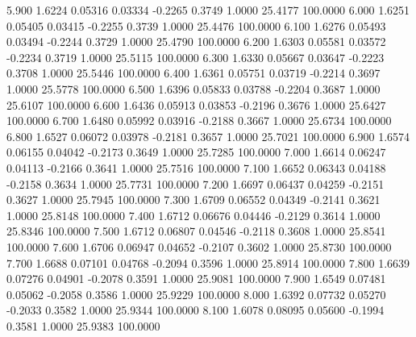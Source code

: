    5.900   1.6224   0.05316   0.03334  -0.2265   0.3749   1.0000  25.4177 100.0000
   6.000   1.6251   0.05405   0.03415  -0.2255   0.3739   1.0000  25.4476 100.0000
   6.100   1.6276   0.05493   0.03494  -0.2244   0.3729   1.0000  25.4790 100.0000
   6.200   1.6303   0.05581   0.03572  -0.2234   0.3719   1.0000  25.5115 100.0000
   6.300   1.6330   0.05667   0.03647  -0.2223   0.3708   1.0000  25.5446 100.0000
   6.400   1.6361   0.05751   0.03719  -0.2214   0.3697   1.0000  25.5778 100.0000
   6.500   1.6396   0.05833   0.03788  -0.2204   0.3687   1.0000  25.6107 100.0000
   6.600   1.6436   0.05913   0.03853  -0.2196   0.3676   1.0000  25.6427 100.0000
   6.700   1.6480   0.05992   0.03916  -0.2188   0.3667   1.0000  25.6734 100.0000
   6.800   1.6527   0.06072   0.03978  -0.2181   0.3657   1.0000  25.7021 100.0000
   6.900   1.6574   0.06155   0.04042  -0.2173   0.3649   1.0000  25.7285 100.0000
   7.000   1.6614   0.06247   0.04113  -0.2166   0.3641   1.0000  25.7516 100.0000
   7.100   1.6652   0.06343   0.04188  -0.2158   0.3634   1.0000  25.7731 100.0000
   7.200   1.6697   0.06437   0.04259  -0.2151   0.3627   1.0000  25.7945 100.0000
   7.300   1.6709   0.06552   0.04349  -0.2141   0.3621   1.0000  25.8148 100.0000
   7.400   1.6712   0.06676   0.04446  -0.2129   0.3614   1.0000  25.8346 100.0000
   7.500   1.6712   0.06807   0.04546  -0.2118   0.3608   1.0000  25.8541 100.0000
   7.600   1.6706   0.06947   0.04652  -0.2107   0.3602   1.0000  25.8730 100.0000
   7.700   1.6688   0.07101   0.04768  -0.2094   0.3596   1.0000  25.8914 100.0000
   7.800   1.6639   0.07276   0.04901  -0.2078   0.3591   1.0000  25.9081 100.0000
   7.900   1.6549   0.07481   0.05062  -0.2058   0.3586   1.0000  25.9229 100.0000
   8.000   1.6392   0.07732   0.05270  -0.2033   0.3582   1.0000  25.9344 100.0000
   8.100   1.6078   0.08095   0.05600  -0.1994   0.3581   1.0000  25.9383 100.0000
